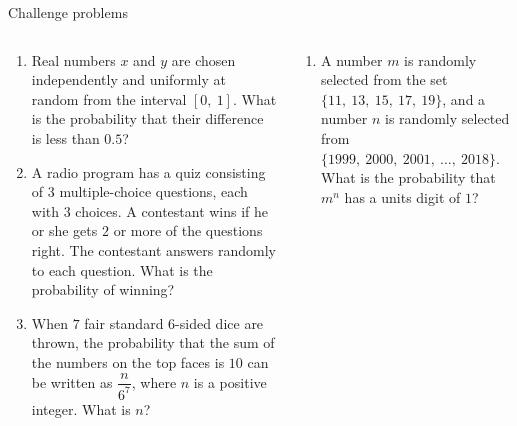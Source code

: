\documentclass[9pt,aspectratio=169]{beamer}
\begin{document}
\begin{frame}{Challenge problems}
  \begin{columns}[T]
    \begin{column}{0.5\textwidth}
      \begin{enumerate}
        \item Real numbers $x$ and $y$ are chosen independently and uniformly at random from the interval $[0,\ 1]$. What is the probability that their difference is less than $0{.}5$?
        \item A radio program has a quiz consisting of $3$ multiple-choice questions, each with $3$ choices. A contestant wins if he or she gets $2$ or more of the questions right. The contestant answers randomly to each question. What is the probability of winning? %
        \item When $7$ fair standard $6$-sided dice are thrown, the probability that the sum of the numbers on the top faces is $10$ can be written as $\dfrac{n}{6^{7}}$, where $n$ is a positive integer. What is $n$? %
        \seti
      \end{enumerate}
    \end{column}
    \begin{column}{0.5\textwidth}
      \begin{enumerate}
        \conti
        \item A number $m$ is randomly selected from the set $\{11,\ 13,\ 15,\ 17,\ 19\}$, and a number $n$ is randomly selected from $\{1999,\ 2000,\ 2001,\ \ldots,\ 2018\}$. What is the probability that $m^n$ has a units digit of $1$? %
      \end{enumerate}
    \end{column}
  \end{columns}
\end{frame}
\end{document}
